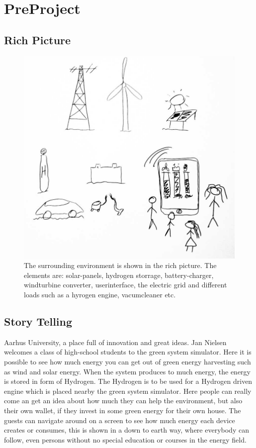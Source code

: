 \section{PreProject}
\subsection{Rich Picture}

\begin{figure}[h!]		%
 \begin{centering}
  \includegraphics[width=1\textwidth]{images/rich_picture1.png}
   \caption{The surrounding environment is shown in the rich picture. The
 			 elements are: solar-panels, hydrogen storrage, battery-charger, windturbine
 			 converter, userinterface, the electric grid and different loads such as a
 			 hyrogen engine, vacumcleaner etc. }
 \end{centering}
\end{figure}

\subsection{Story Telling}
Aarhus University, a place full of innovation and great ideas. Jan Nielsen
welcomes a class of high-school students to the green system simulator. Here it
is possible to see how much energy you can get out of green energy harvesting
such as wind and solar energy. When the system produces to much energy, the 
energy is stored in form of Hydrogen. The Hydrogen is to be used for a Hydrogen
driven engine which is placed nearby the green system simulator. Here people can
really come an get an idea about how much they can help the environment, but
also their own wallet, if they invest in some green energy for their own house.
The guests can navigate around on a screen to see how much energy each device 
creates or consumes, this is shown in a down to earth way, where everybody can follow, 
even persons without no special education or courses in the energy field.
